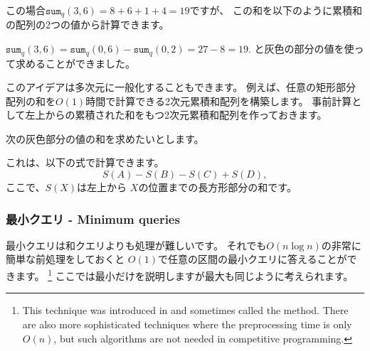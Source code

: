 この場合$\texttt{sum}_q(3,6)=8+6+1+4=19$ですが、
この和を以下のように累積和の配列の2つの値から計算できます。
\begin{center}
\end{center}
$\texttt{sum}_q(3,6)=\texttt{sum}_q(0,6)-\texttt{sum}_q(0,2)=27-8=19$.
と灰色の部分の値を使って求めることができました。

このアイデアは多次元に一般化することもできます。
例えば、任意の矩形部分配列の和を$O(1)$時間で計算できる2次元累積和配列を構築します。
事前計算として左上からの累積された和をもつ2次元累積和配列を作っておきます。

\begin{samepage}
次の灰色部分の値の和を求めたいとします。
\begin{center}
\end{center}
\end{samepage}

これは、以下の式で計算できます。
\[S(A) - S(B) - S(C) + S(D),\]
ここで、$S(X )$は左上から $X$の位置までの長方形部分の和です。

\subsubsection{最小クエリ - Minimum queries}


最小クエリは和クエリよりも処理が難しいです。
それでも$O(n \log n)$の非常に簡単な前処理をしておくと
$O(1)$で任意の区間の最小クエリに答えることができます。
\footnote{This technique
was introduced in \cite{ben00} and sometimes
called the  method.
There are also more sophisticated techniques \cite{fis06} where
the preprocessing time is only $O(n)$, but such algorithms
are not needed in competitive programming.}
ここでは最小だけを説明しますが最大も同じように考えられます。

